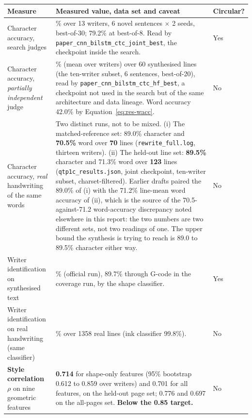 \begin{table}[h]
\centering
\fontsize{9.5}{11.5}\selectfont
\begin{tabularx}{\linewidth}{|>{\raggedright\arraybackslash}p{4.6cm}|>{\raggedright\arraybackslash}X|>{\raggedright\arraybackslash}p{2.0cm}|}
\hline
\textbf{Measure} & \textbf{Measured value, data set and caveat} & \textbf{Circular?} \\
\hline
Character accuracy, search judges & 82.2\% over 13 writers, 6 novel sentences $\times$ 2 seeds, best-of-30; 79.2\% at best-of-8. Read by \texttt{paper\_cnn\_bilstm\_ctc\_joint\_best}, the checkpoint inside the search. & Yes \\
\hline
Character accuracy, \emph{partially independent} judge & 81.2\% (mean over writers) over 60 synthesised lines (the ten-writer subset, 6 sentences, best-of-20), read by \texttt{paper\_cnn\_bilstm\_ctc\_hf\_best}, a checkpoint not used in the search but of the same architecture and data lineage. Word accuracy 42.0\% by Equation~\ref{eq:res-wacc}. & No \\
\hline
Character accuracy, \emph{real} handwriting of the same words & Two distinct runs, not to be mixed. (i) The matched-reference set: 89.0\% character and \textbf{70.5\%} word over \textbf{70} lines (\texttt{rewrite\_full.log}, thirteen writers). (ii) The held-out line set: \textbf{89.5\%} character and 71.3\% word over \textbf{123} lines (\texttt{qtp1c\_results.json}, joint checkpoint, ten-writer subset, charset-filtered). Earlier drafts paired the 89.0\% of (i) with the 71.2\% line-mean word accuracy of (ii), which is the source of the 70.5-against-71.2 word-accuracy discrepancy noted elsewhere in this report: the two numbers are two different sets, not two readings of one. The upper bound the synthesis is trying to reach is 89.0 to 89.5\% character either way. & No \\
\hline
Writer identification on synthesised text & 80.1\% (official run), 89.7\% through G-code in the coverage run, by the shape classifier. & Yes \\
\hline
Writer identification on real handwriting (same classifier) & 93.7\% over 1358 real lines (ink classifier 99.8\%). & No \\
\hline
\textbf{Style correlation} $\rho$ on nine geometric features & \textbf{0.714} for shape-only features (95\% bootstrap 0.612 to 0.859 over writers) and 0.701 for all features, on the held-out page set; 0.776 and 0.697 on the all-pages set. \textbf{Below the 0.85 target.} & No \\

\end{tabularx}
\end{table}
